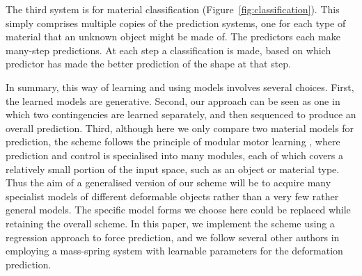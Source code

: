 \documentclass[journal]{IEEEtran}
\begin{document}
The third system is for material classification (Figure~\ref{fig:classification}). This simply comprises multiple copies of the prediction systems, one for each type of material that an unknown object might be made of. The predictors each make many-step predictions. At each step a classification is made, based on which predictor has made the better prediction of the shape at that step.

In summary, this way of learning and using models involves several choices. First, the learned models are generative. Second, our approach can be seen as one in which two contingencies are learned separately, and then sequenced to produce an overall prediction. Third, although here we only compare two material models for prediction, the scheme follows the principle of modular motor learning \cite{kopickiwyatt16,haruno2001mosaic}, where prediction and control is specialised into many modules, each of which covers a relatively small portion of the input space, such as an object or material type. Thus the aim of a generalised version of our scheme will be to acquire many specialist models of different deformable objects rather than a very few rather general models. The specific model forms we choose here could be replaced while retaining the overall scheme. In this paper, we implement the scheme using a regression approach to force prediction, and we follow several other authors in employing a mass-spring system with learnable parameters for the deformation prediction.
\end{document}
